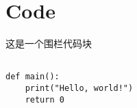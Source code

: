 \section{Code}

这是一个围栏代码块


\begin{verbatim}

def main():
    print("Hello, world!")
    return 0

\end{verbatim}

